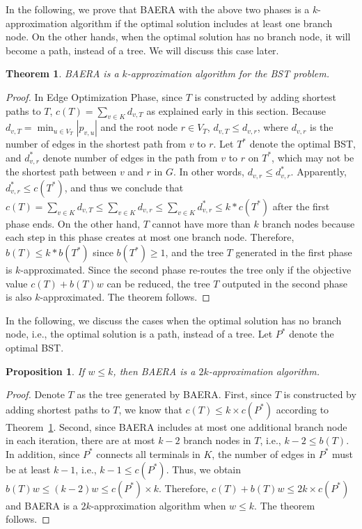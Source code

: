 \documentclass[conference]{IEEEtran}
\newtheorem{theorem}{Theorem}
\newtheorem{proposition}{Proposition}
\begin{document}
In the following, we prove that BAERA with the above two phases is a $k$-approximation algorithm if the optimal solution includes at least one
branch node. On the other hands, when the optimal solution has no branch
node, it will become a path, instead of a tree.  We will discuss this case later.


\begin{theorem}
BAERA is a $k$-approximation algorithm for the BST problem.
\label{thm:k_ratio}
\end{theorem}

\begin{proof}
In Edge Optimization Phase, since $T$ is constructed by adding shortest
paths to $T$, $c(T)=\sum_{v\in K}d_{v,T}$ as explained early in this
section. Because $d_{v,T}=\min_{u\in V_{T}}\left \vert p_{v,u}\right \vert $
and the root node $r\in V_{T}$, $d_{v,T}\leq d_{v,r}$, where $d_{v,r}$ is
the number of edges in the shortest path from $v$ to $r$. Let $T^{\ast }$
denote the optimal BST, and $d_{v,r}^{\ast }$ denote number of edges in the
path from $v$ to $r$ on $T^{\ast }$, which may not be the shortest path
between $v$ and $r$ in $G$. In other words, $d_{v,r}\leq d_{v,r}^{\ast }$.
Apparently, $d_{v,r}^{\ast }\leq c(T^{\ast })$, and thus we conclude that $c(T)=\sum_{v\in K}d_{v,T}\leq \sum_{v\in K}d_{v,r}\leq \sum_{v\in
K}d_{v,r}^{\ast }\leq k\ast c(T^{\ast })$ after the first phase ends. On the
other hand, $T$ cannot have more than $k$ branch nodes because each step in
this phase creates at most one branch node. Therefore, $b(T)\leq k\ast
b(T^{\ast })$ since $b(T^{\ast })\geq 1$, and the tree $T$ generated in the
first phase is $k$-approximated. Since the second phase re-routes the tree
only if the objective value $c(T)+b(T)w$ can be reduced, the tree $T$
outputed in the second phase is also $k$-approximated. The theorem follows.
\end{proof}



In the following, we discuss the cases when  the optimal solution has no branch node, i.e., the optimal solution is a path, instead of a tree. Let $P^{\ast }$ denote the optimal BST.

\begin{proposition}
If $w\leq k$, then BAERA is a $2k$-approximation algorithm.
\label{thm:2k_approx}
\end{proposition}

\begin{proof}
Denote $T$ as the tree generated by BAERA. First, since $T$ is constructed by adding shortest paths to $T$, we know that $c(T) \leq k \times c(P^*)$ according to Theorem~\ref{thm:k_ratio}. Second, since BAERA includes at most one additional branch node in each iteration, there are at most $k-2$ branch nodes in $T$, i.e., $k-2 \leq b(T)$.  In addition, since $P^*$ connects all terminals in $K$, the number of edges in $P^*$ must be at least $k - 1$, i.e., $k-1 \leq c(P^*)$. Thus, we obtain $b(T)w \leq (k-2)w \leq c(P^*) \times k$. Therefore, $c(T)+b(T)w \leq 2k \times c(P^*)$ and BAERA is a $2k$-approximation algorithm when $w \leq k$. The theorem follows.
\end{proof}
\end{document}
